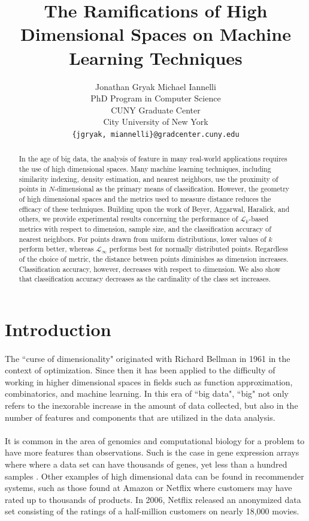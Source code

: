 \documentclass{article}
\title{The Ramifications of High Dimensional Spaces on Machine Learning Techniques}
\author{Jonathan Gryak
\qquad
Michael Iannelli\\
PhD Program in Computer Science\\
CUNY Graduate Center\\
City University of New York\\
\texttt{\{jgryak, miannelli\}@gradcenter.cuny.edu}}
\date{}
\begin{document}
\maketitle

\begin{abstract}
In the age of big data, the analysis of feature in many real-world applications requires the use of high dimensional spaces. Many machine learning techniques, including similarity indexing, density estimation, and nearest neighbors, use the proximity of points in $N$-dimensional as the primary means of classification. However, the geometry of high dimensional spaces and the metrics used to measure distance reduces the efficacy of these techniques. Building upon the work of Beyer, Aggarwal, Haralick, and others, we provide experimental results concerning the performance of $\mathcal{L}_k$-based metrics with respect to dimension, sample size, and the classification accuracy of nearest neighbors. For points drawn from uniform distributions, lower values of $k$ perform better, whereas $\mathcal{L}_{\infty}$ performs best for normally distributed points.  Regardless of the choice of metric, the distance between points diminishes as dimension increases. Classification accuracy, however, decreases with respect to dimension. We also show that classification accuracy decreases as the cardinality of the class set increases.
\end{abstract}
\tableofcontents
\section{Introduction}
\paragraph{}
The ``curse of dimensionality" originated with Richard Bellman in 1961\cite{bellman1961adaptive} in the context of optimization. Since then it has been applied to the difficulty of working in higher dimensional spaces in fields such as function approximation, combinatorics, and machine learning. In this era of ``big data", ``big" not only refers to the inexorable increase in the amount of data collected, but also in the number of features and components that are utilized in the data analysis.  
\paragraph{}
It is common in the area of genomics and computational biology for a problem to have more features than observations.  Such is the case in gene expression arrays where where a data set can have thousands of genes, yet less than a hundred samples \cite{hastie01statisticallearning}.  Other examples of high dimensional data can be found in recommender systems, such as those found at Amazon or Netflix where customers may have rated up to thousands of products.  In 2006, Netflix released an anonymized data set consisting of the ratings of a half-million customers on nearly 18,000 movies\cite{Bennett:2007:KCW:1345448.1345459}.
\end{document}
